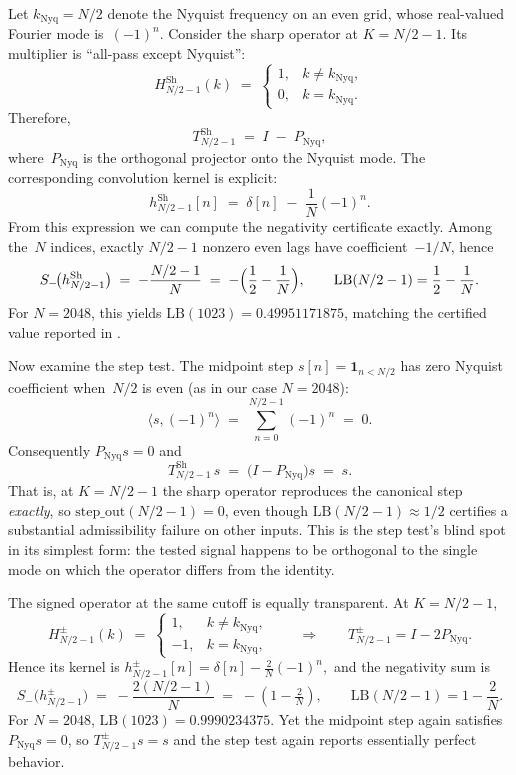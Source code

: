 \documentclass[11pt,a4paper]{article}
\theoremstyle{plain}
\theoremstyle{definition}
\theoremstyle{plain}
\newcommand{\Sminus}{S_{-}}
\newcommand{\stepout}{\mathrm{step\_out}}
\begin{document}
Let $k_{\mathrm{Nyq}} = N/2$ denote the Nyquist frequency on an even grid,
whose real-valued Fourier mode is~$(-1)^n$.  Consider the sharp operator at
$K = N/2-1$.  Its multiplier is ``all-pass except Nyquist'':
\[
  H^{\mathrm{Sh}}_{N/2-1}(k) \;=\;
  \begin{cases}
    1, & k \neq k_{\mathrm{Nyq}},\\
    0, & k = k_{\mathrm{Nyq}}.
  \end{cases}
\]
Therefore,
\[
  T^{\mathrm{Sh}}_{N/2-1} \;=\; I \;-\; P_{\mathrm{Nyq}},
\]
where~$P_{\mathrm{Nyq}}$ is the orthogonal projector onto the Nyquist mode.
The corresponding convolution kernel is explicit:
\[
  h^{\mathrm{Sh}}_{N/2-1}[n]
  \;=\;
  \delta[n] \;-\; \frac{1}{N}(-1)^n.
\]
From this expression we can compute the negativity certificate exactly.  Among
the~$N$ indices, exactly $N/2-1$ nonzero even lags have coefficient~$-1/N$,
hence
\[
  \Sminus\!\bigl(h^{\mathrm{Sh}}_{N/2-1}\bigr)
  \;=\;
  -\frac{N/2-1}{N}
  \;=\;
  -\Bigl(\frac{1}{2} - \frac{1}{N}\Bigr),
  \qquad
  \mathrm{LB}(N/2-1) = \frac{1}{2} - \frac{1}{N}.
\]
For $N = 2048$, this yields $\mathrm{LB}(1023) = 0.49951171875$, matching the
certified value reported in .

Now examine the step test.  The midpoint step $s[n] = \mathbf{1}_{n<N/2}$ has
zero Nyquist coefficient when~$N/2$ is even (as in our case $N = 2048$):
\[
  \langle s, (-1)^n \rangle
  \;=\;
  \sum_{n=0}^{N/2-1} (-1)^n
  \;=\; 0.
\]
Consequently $P_{\mathrm{Nyq}} s = 0$ and
\[
  T^{\mathrm{Sh}}_{N/2-1}\, s
  \;=\;
  \bigl(I - P_{\mathrm{Nyq}}\bigr) s
  \;=\; s.
\]
That is, at $K = N/2-1$ the sharp operator reproduces the canonical step
\emph{exactly}, so $\stepout(N/2-1) = 0$, even though
$\mathrm{LB}(N/2-1) \approx 1/2$ certifies a substantial admissibility failure
on other inputs.  This is the step test's blind spot in its simplest form: the
tested signal happens to be orthogonal to the single mode on which the operator
differs from the identity.

The signed operator at the same cutoff is equally transparent.  At $K = N/2-1$,
\[
  H^{\pm}_{N/2-1}(k) \;=\;
  \begin{cases}
    1, & k \neq k_{\mathrm{Nyq}},\\
    -1, & k = k_{\mathrm{Nyq}},
  \end{cases}
  \qquad\Longrightarrow\qquad
  T^{\pm}_{N/2-1} = I - 2P_{\mathrm{Nyq}}.
\]
Hence its kernel is
$h^{\pm}_{N/2-1}[n] = \delta[n] - \frac{2}{N}(-1)^n,$
and the negativity sum is
\[
  \Sminus\!\bigl(h^{\pm}_{N/2-1}\bigr)
  \;=\;
  -\frac{2(N/2-1)}{N}
  \;=\;
  -(1 - \tfrac{2}{N}),
  \qquad
  \mathrm{LB}(N/2-1) = 1 - \frac{2}{N}.
\]
For $N = 2048$, $\mathrm{LB}(1023) = 0.9990234375$.  Yet the midpoint step
again satisfies $P_{\mathrm{Nyq}} s = 0$, so $T^{\pm}_{N/2-1} s = s$ and the
step test again reports essentially perfect behavior.
\end{document}

